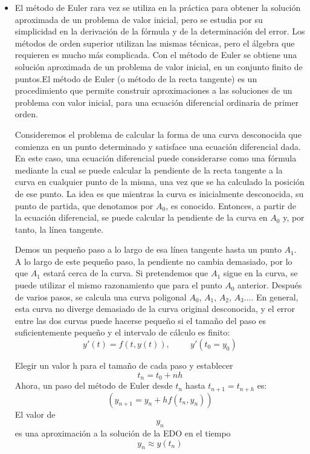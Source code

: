 \documentclass[12 pt,letterpaper]{article}
\begin{document}
	\begin{itemize}
		\item\justify 
		El método de Euler rara vez se utiliza en la práctica para obtener la solución aproximada de un problema de valor inicial, pero se estudia por su simplicidad en la derivación de la fórmula y de la determinación del error. Los métodos de orden superior utilizan las mismas técnicas, pero el álgebra que requieren es mucho más complicada. Con el método de Euler se obtiene una solución aproximada de un problema de valor inicial, en un conjunto finito de puntos.El método de Euler (o método de la recta tangente) es un procedimiento que permite construir aproximaciones a las soluciones de un problema con valor inicial, para una ecuación diferencial ordinaria de primer orden.
		
		\begin{flushleft}
			\fbox{\textcolor{purple}{Ejercicio de aplicación}}\vspace{0.5cm}
		\end{flushleft}
		
		\justify 
		Consideremos el problema de calcular la forma de una curva desconocida que comienza en un punto determinado y satisface una ecuación diferencial dada. En este caso, una ecuación diferencial puede considerarse como una fórmula mediante la cual se puede calcular la pendiente de la recta tangente a la curva en cualquier punto de la misma, una vez que se ha calculado la posición de ese punto. La idea es que mientras la curva es inicialmente desconocida, su punto de partida, que denotamos por {$A_{0} $}, es conocido. Entonces, a partir de la ecuación diferencial, se puede calcular la pendiente de la curva en {$A_{0} $} y, por tanto, la línea tangente.
		
		Demos un pequeño paso a lo largo de esa línea tangente hasta un punto {$A_{1} $}. A lo largo de este pequeño paso, la pendiente no cambia demasiado, por lo que {$A_{1} $} estará cerca de la curva. Si pretendemos que {$A_{1} $} sigue en la curva, se puede utilizar el mismo razonamiento que para el punto {$A_{0} $} anterior. Después de varios pasos, se calcula una curva poligonal {$A_{0} $}, {$A_{1} $}, {$A_{2} $}, {$A_{3} $}.... En general, esta curva no diverge demasiado de la curva original desconocida, y el error entre las dos curvas puede hacerse pequeño si el tamaño del paso es suficientemente pequeño y el intervalo de cálculo es finito: \[y'(t)= f(t,y(t)), \hspace{1cm}  y'(t_{0}=y_{0}) \]\vspace{0.3cm}
		
		Elegir un valor h para el tamaño de cada paso y establecer
		\[ 
		t_{n}=t_{0}+nh
		\]
		\vspace{0.5cm}
		Ahora, un paso del método de Euler desde $t_{n}$ hasta $t_{n+1} = t_{n+h}$ es:
		\[ 
		(y_{n+1}=y_{n}+hf(t_{n},y_{n}))
		\]
		\vspace{0.5cm}
		El valor de  \[y_{n}\]  es una aproximación a la solución de la EDO en el tiempo \[y_{n}\approx y(t_{n})\]
		
		
	\end{itemize}
	
\end{document}

